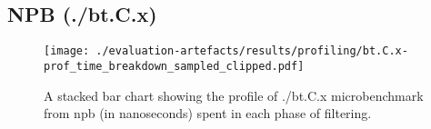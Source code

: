 \subsection{NPB (./bt.C.x)}
\begin{figure}[H]
    \centering
    \texttt{[image: ./evaluation-artefacts/results/profiling/bt.C.x-prof\_time\_breakdown\_sampled\_clipped.pdf]}
    \caption{A stacked bar chart showing the profile of ./bt.C.x microbenchmark
      from \ac{npb} (in nanoseconds) \af
    spent in each phase of filtering.}
    \label{fig:npb-profile}
\end{figure}
